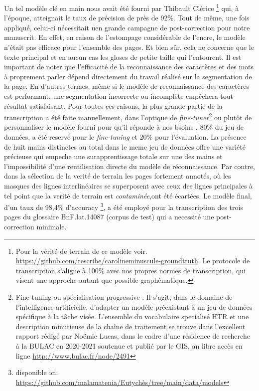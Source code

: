 \documentclass[a4paper, twoside, 12pt]{book}
\begin{document}
Un tel modèle \og{} clé en main \fg{} nous avait été fourni par Thibault Clérice \footnote{Pour la vérité de terrain de ce modèle voir. \url{https://github.com/rescribe/carolineminuscule-groundtruth}. Le protocole de transcription s'aligne à 100\% avec nos propres normes de transcription, qui visent une approche autant que possible graphématique.} qui, à l'époque, atteignait le taux de précision  de près de 92\%. Tout de même, une fois appliqué, celui-ci  nécessitait
uen grande campagne de post-correction pour notre manuscrit. En effet, en raison de l'estompage considérable de l'encre, le modèle n'était pas efficace pour l'ensemble des pages. Et bien sûr, cela ne concerne que le texte principal et en aucun cas les gloses de petite taille qui l'entourent. Il est important de noter que l’efficacité de la reconnaissance des caractères et des mots à proprement parler dépend directement du travail réalisé sur la segmentation de la page. En d’autres termes, même si le modèle de reconnaissance des caractères est performant, une segmentation incorrecte ou
incomplète empêchera tout résultat satisfaisant. Pour toutes ces raisons, la plus grande partie de la transcription a été faite manuellement, dans l'optique de \textit{fine-tuner}\footnote{ \og{} Fine tuning ou spécialisation progressive : Il s’agit, dans le domaine de l’intelligence artificielle, d’adapter un modèle préexistant à un jeu de données spécifique à la tâche visée.\fg{} L'ensemble du vocabulaire specialisé HTR et une description minutieuse de la chaîne de traitement se trouve dans l'excellent rapport rédigé par Noëmie Lucas, dans le cadre d'une résidence de recherche à la BULAC en 2020-2021 soutenue et publié par le GIS, an libre accès en ligne \url{http://www.bulac.fr/node/2491}
} ou plutôt de personnaliser le modèle fourni pour qu'il réponde à nos bsoins . 80\% du jeu de données, a été reservé pour le \textit{fine-tuning} et 20\% pour l'évaluation. La présence de huit mains distinctes au total dans le meme jeu de données offre une variété précieuse qui empeche une surapprentissage totale sur une des mains et l'impossibilité d'une reutilisation directe du modèle de réconnaissance. Par contre, dans la sélection de la verité de terrain les pages fortement annotés, où les masques des lignes interlinéaires se superposent avec ceux des lignes principales à tel point  que la verité de terrain est \textit{contaminée},ont été écartées. Le modèle final, d'un taux de 98,4\% d'accuracy \footnote{disponible ici: \url{https://github.com/malamatenia/Eutychès/tree/main/data/models}}, a été employé pour la transcription des trois pages du glossaire BnF.lat.14087 (corpus de test) qui a necessité une post-correction minimale. \\
\end{document}
